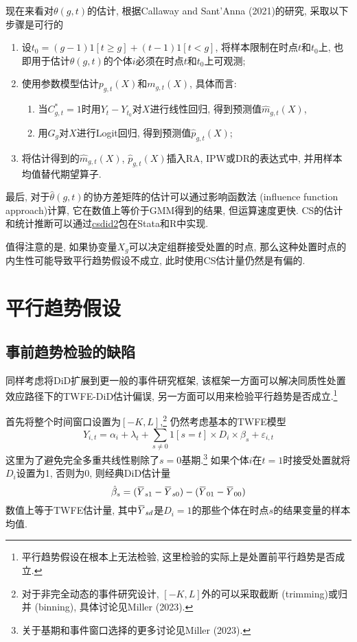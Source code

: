 \documentclass[cn,blue,14pt,screen,bibstyle=gb7714-2015]{elegantnote}
\newcommand{\overbar}[1]{\mkern 1.5mu\overline{\mkern-1.5mu#1\mkern-1.5mu}\mkern 1.5mu}
\begin{document}
现在来看对$\theta(g,t)$的估计, 根据Callaway and Sant'Anna (2021)的研究, 采取以下步骤是可行的
\begin{enumerate}[label=\arabic*.]
  \item 设$t_0=(g-1)1[t\ge g]+(t-1)1[t<g]$, 将样本限制在时点$t$和$t_0$上, 也即用于估计$\theta(g,t)$的个体$i$必须在时点$t$和$t_0$上可观测;
  \item 使用参数模型估计$p_{g,t}(X)$和$m_{g,t}(X)$, 具体而言:
  \begin{enumerate}[label=\alph*.]
    \item 当$C_{g,t}^\ast=1$时用$Y_{t}-Y_{t_0}$对$X$进行线性回归, 得到预测值$\hat{m}_{g,t}(X)$,
    \item 用$G_g$对$X$进行Logit回归, 得到预测值$\hat{p}_{g,t}(X)$;
  \end{enumerate}
  \item 将估计得到的$\hat{m}_{g,t}(X)$, $\hat{p}_{g,t}(X)$插入RA, IPW或DR的表达式中, 并用样本均值替代期望算子.
\end{enumerate}
最后, 对于$\hat{\theta}(g,t)$的协方差矩阵的估计可以通过影响函数法 (influence function approach)计算, 它在数值上等价于GMM得到的结果, 但运算速度更快. CS的估计和统计推断可以通过\href{https://github.com/friosavila/csdid2}{csdid2}包在Stata和R中实现.

值得注意的是, 如果协变量$X_g$可以决定组群接受处置的时点, 那么这种处置时点的内生性可能导致平行趋势假设不成立, 此时使用CS估计量仍然是有偏的.

\newpage
\section{平行趋势假设}
\subsection{事前趋势检验的缺陷}
同样考虑将DiD扩展到更一般的事件研究框架, 该框架一方面可以解决同质性处置效应路径下的TWFE-DiD估计偏误, 另一方面可以用来检验平行趋势是否成立.\footnote{平行趋势假设在根本上无法检验, 这里检验的实际上是处置前平行趋势是否成立.}

首先将整个时间窗口设置为$[-K,L]$,\footnote{对于非完全动态的事件研究设计, $[-K,L]$外的可以采取截断 (trimming)或归并 (binning), 具体讨论见Miller (2023).} 仍然考虑基本的TWFE模型
$$Y_{i,t}=\alpha_i+\lambda_t+\sum_{s\ne0}1[s=t]\times D_i\times\beta_s+\varepsilon_{i,t}$$
这里为了避免完全多重共线性剔除了$s=0$基期.\footnote{关于基期和事件窗口选择的更多讨论见Miller (2023).} 如果个体$i$在$t=1$时接受处置就将$D_i$设置为1, 否则为0, 则经典DiD估计量
$$\hat{\beta}_s=(\overbar{Y}_{s1}-\overbar{Y}_{s0})-(\overbar{Y}_{01}-\overbar{Y}_{00})$$
数值上等于TWFE估计量, 其中$\overbar{Y}_{sd}$是$D_i=1$的那些个体在时点$s$的结果变量的样本均值.
\end{document}
